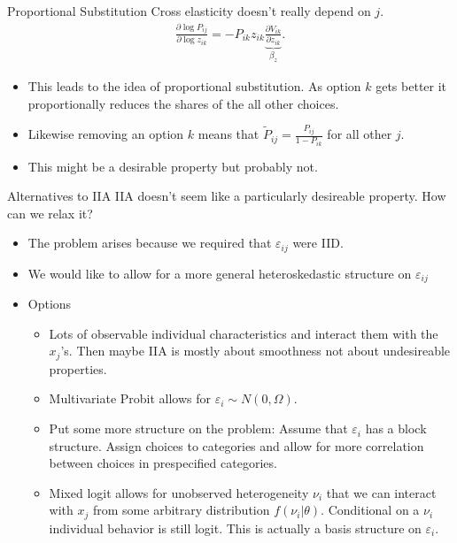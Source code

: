 \documentclass[xcolor=pdftex,dvipsnames,table,mathserif]{beamer}
\begin{document}
\begin{frame}{Proportional Substitution}
Cross elasticity doesn't really depend on $j$.
\begin{eqnarray*}
\frac{ \partial \log P_{ij}}{ \partial \log z_{ik}} = -P_{ik} z_{ik} \underbrace{\frac{\partial V_{ik}}{\partial z_{ik}}}_{\beta_z}.
\end{eqnarray*}
\begin{itemize}
\item This leads to the idea of proportional substitution. As option $k$ gets better it proportionally reduces the shares of the all other choices.
\item Likewise removing an option $k$ means that $\tilde{P}_{ij} = \frac{P_{ij}}{1-P_{ik}}$ for all other $j$.
\item This might be a desirable property but probably not.
\end{itemize}
\end{frame}



\begin{frame}{Alternatives to IIA}
IIA doesn't seem like a particularly desireable property. How can we relax it?
\begin{itemize}
\item The problem arises because we required that $\varepsilon_{ij}$ were IID.
\item We would like to allow for a more general heteroskedastic structure on $\varepsilon_{ij}$
\item Options
\begin{itemize}
\item Lots of observable individual characteristics and interact them with the $x_j$'s. Then maybe IIA is mostly about smoothness not about undesireable properties.
\item Multivariate Probit allows for $\varepsilon_i \sim N(0,\Omega)$.
\item Put some more structure on the problem: Assume that $\varepsilon_i$ has a block structure. Assign choices to categories and allow for more correlation between choices in prespecified categories.
\item Mixed logit allows for unobserved heterogeneity $\nu_{i}$ that we can interact with $x_j$ from some arbitrary distribution $f(\nu_i | \theta)$. Conditional on a $\nu_i$ individual behavior is still logit. This is actually a basis structure on $\varepsilon_i$.
\end{itemize}
\end{itemize}
\end{frame}
\end{document}
